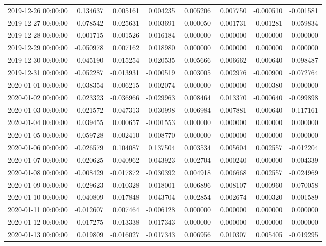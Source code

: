 \begin{tabular}{lrrrrrrr}
2019-12-26 00:00:00 & 0.134637 & 0.005161 & 0.004235 & 0.005206 & 0.007750 & -0.000510 & -0.001581 \\
2019-12-27 00:00:00 & 0.078542 & 0.025631 & 0.003691 & 0.000050 & -0.001731 & -0.001281 & 0.059834 \\
2019-12-28 00:00:00 & 0.001715 & 0.001526 & 0.016184 & 0.000000 & 0.000000 & 0.000000 & 0.000000 \\
2019-12-29 00:00:00 & -0.050978 & 0.007162 & 0.018980 & 0.000000 & 0.000000 & 0.000000 & 0.000000 \\
2019-12-30 00:00:00 & -0.045190 & -0.015254 & -0.020535 & -0.005666 & -0.006662 & -0.000640 & 0.098487 \\
2019-12-31 00:00:00 & -0.052287 & -0.013931 & -0.000519 & 0.003005 & 0.002976 & -0.000900 & -0.072764 \\
2020-01-01 00:00:00 & 0.038354 & 0.006215 & 0.002074 & 0.000000 & 0.000000 & -0.000380 & 0.000000 \\
2020-01-02 00:00:00 & 0.023323 & -0.036966 & -0.029963 & 0.008464 & 0.013370 & -0.000640 & -0.099898 \\
2020-01-03 00:00:00 & 0.021572 & 0.047313 & 0.030998 & -0.006984 & -0.007881 & 0.000640 & 0.117161 \\
2020-01-04 00:00:00 & 0.039455 & 0.000657 & -0.001553 & 0.000000 & 0.000000 & 0.000000 & 0.000000 \\
2020-01-05 00:00:00 & 0.059728 & -0.002410 & 0.008770 & 0.000000 & 0.000000 & 0.000000 & 0.000000 \\
2020-01-06 00:00:00 & -0.026579 & 0.104087 & 0.137504 & 0.003534 & 0.005604 & 0.002557 & -0.012204 \\
2020-01-07 00:00:00 & -0.020625 & -0.040962 & -0.043923 & -0.002704 & -0.000240 & 0.000000 & -0.004339 \\
2020-01-08 00:00:00 & -0.008429 & -0.017872 & -0.030392 & 0.004918 & 0.006668 & 0.002557 & -0.024969 \\
2020-01-09 00:00:00 & -0.029623 & -0.010328 & -0.018001 & 0.006896 & 0.008107 & -0.000960 & -0.070058 \\
2020-01-10 00:00:00 & -0.040809 & 0.017848 & 0.043704 & -0.002854 & -0.002674 & 0.000320 & 0.001589 \\
2020-01-11 00:00:00 & -0.012607 & 0.007464 & -0.006128 & 0.000000 & 0.000000 & 0.000000 & 0.000000 \\
2020-01-12 00:00:00 & -0.017275 & 0.013338 & 0.017343 & 0.000000 & 0.000000 & 0.000000 & 0.000000 \\
2020-01-13 00:00:00 & 0.019809 & -0.016027 & -0.017343 & 0.006956 & 0.010307 & 0.005405 & -0.019295 \\

\end{tabular}
